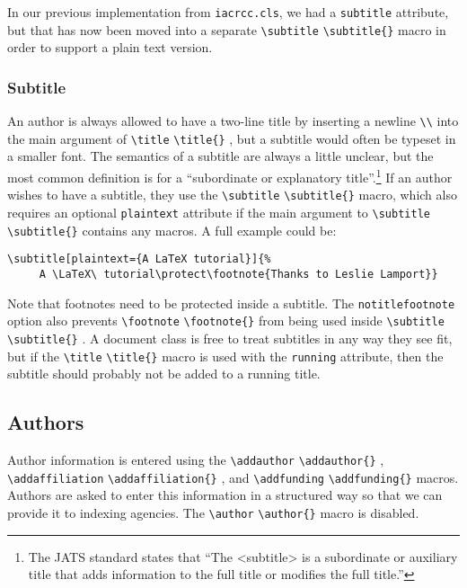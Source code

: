 \documentclass{article}
\newcommand{\cmd}[2][]{%
  \def\FirstArg{#1}%
  \ifx\FirstArg\empty%
    \texttt{\textbackslash{}#2}%
  \else%
    \texttt{\textbackslash{}#2\{#1\}}%
  \fi
}
\begin{document}
In our previous implementation from \texttt{iacrcc.cls}, we had a
\texttt{subtitle} attribute, but that has now been moved into a separate
\cmd{subtitle} macro in order to support a plain text version.

\subsubsection{Subtitle}
An author is always allowed to have a two-line title by inserting a
newline \texttt{\textbackslash\textbackslash} into the main argument
of \cmd{title}, but a subtitle would often be typeset in a smaller
font.  The semantics of a subtitle are always a little unclear, but
the most common definition is for a ``subordinate or explanatory
title''.\footnote{The JATS standard states that ``The <subtitle> is a
subordinate or auxiliary title that adds information to the full title
or modifies the full title.''}  If an author wishes to have a
subtitle, they use the \cmd{subtitle} macro, which also requires an
optional \texttt{plaintext} attribute if the main argument
to \cmd{subtitle} contains any macros.  A full example could be:
\begin{Verbatim}[samepage=true]
\subtitle[plaintext={A LaTeX tutorial}]{%
     A \LaTeX\ tutorial\protect\footnote{Thanks to Leslie Lamport}}
\end{Verbatim}
Note that footnotes need to be protected inside a subtitle.
The \texttt{notitlefootnote} option also prevents
\cmd{footnote} from being used inside \cmd{subtitle}. A
document class is free to treat subtitles in any way they see fit, but
if the \cmd{title} macro is used with the \texttt{running} attribute,
then the subtitle should probably not be added to a running title.

\subsection{Authors}
Author information is entered using the \cmd{addauthor},
\cmd{addaffiliation}, and \cmd{addfunding} macros. Authors are asked
to enter this information in a structured way so that we can provide
it to indexing agencies. The \cmd{author} macro is disabled.
\end{document}
